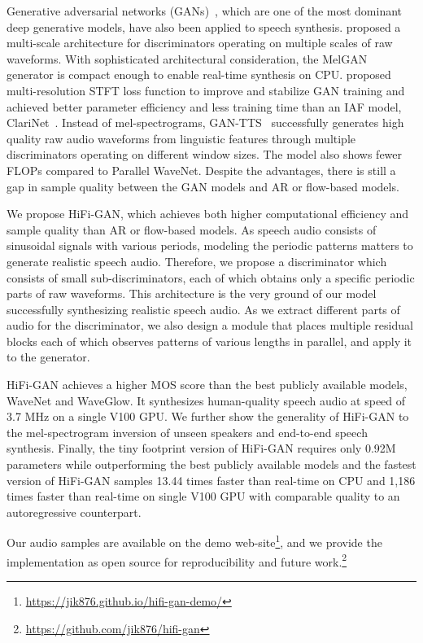 Generative adversarial networks (GANs)~\citep{goodfellow2014generative}, which are one of the most dominant deep generative models, have also been applied to speech synthesis. \citet{Kumar2018melgan} proposed a multi-scale architecture for discriminators operating on multiple scales of raw waveforms. With sophisticated architectural consideration, the MelGAN generator is compact enough to enable real-time synthesis on CPU. \citet{yamamoto2020parallel} proposed multi-resolution STFT loss function to improve and stabilize GAN training and achieved better parameter efficiency and less training time than an IAF model, ClariNet~\citep{ping2018clarinet}. Instead of mel-spectrograms, GAN-TTS~\citep{binkowski2019high} successfully generates high quality raw audio waveforms from linguistic features through multiple discriminators operating on different window sizes. The model also shows fewer FLOPs compared to Parallel WaveNet. Despite the advantages, there is still a gap in sample quality between the GAN models and AR or flow-based models.

We propose HiFi-GAN, which achieves both higher computational efficiency and sample quality than AR or flow-based models. As speech audio consists of sinusoidal signals with various periods, modeling the periodic patterns matters to generate realistic speech audio. Therefore, we propose a discriminator which consists of small sub-discriminators, each of which obtains only a specific periodic parts of raw waveforms. This architecture is the very ground of our model successfully synthesizing realistic speech audio. As we extract different parts of audio for the discriminator, 
we also design a module that places multiple residual blocks each of which observes patterns of various lengths in parallel, and apply it to the generator.

HiFi-GAN achieves a higher MOS score than the best publicly available models, WaveNet and WaveGlow. It synthesizes human-quality speech audio at speed of 3.7 MHz on a single V100 GPU. We further show the generality of HiFi-GAN to the mel-spectrogram inversion of unseen speakers and end-to-end speech synthesis. Finally, the tiny footprint version of HiFi-GAN requires only 0.92M parameters while outperforming the best publicly available models and the fastest version of HiFi-GAN samples 13.44 times faster than real-time on CPU and 1,186 times faster than real-time on single V100 GPU with comparable quality to an autoregressive counterpart. 

Our audio samples are available on the demo  web-site\footnote{\href{https://jik876.github.io/hifi-gan-demo/}{https://jik876.github.io/hifi-gan-demo/}}, and we provide the implementation as open source for reproducibility and future work.\footnote{\href{https://github.com/jik876/hifi-gan}{https://github.com/jik876/hifi-gan}}
